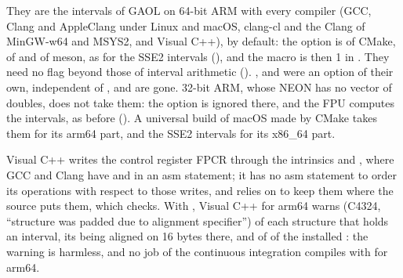 \documentclass[12pt,a4paper,twoside,openright]{book}
\begin{document}
\medskip
They are the intervals of GAOL on 64-bit ARM with every compiler (GCC, Clang
and AppleClang under Linux and macOS, clang-cl and the Clang of MinGW-w64 and
MSYS2, and Visual C++), by default: the option is  of
CMake,  of  and  of
meson, as for the SSE2 intervals (), and the macro
 is then 1 in
. They need no flag beyond those of interval
arithmetic (). ,
 and  were an option of their
own, independent of , and are gone.\newinvfive{} 32-bit
ARM, whose NEON has no vector of doubles, does not take them: the option is
ignored there, and the FPU computes the intervals, as before
(). A universal build of macOS made by CMake takes
them for its arm64 part, and the SSE2 intervals for its x86\_64 part.

\medskip
Visual C++ writes the control register FPCR through the intrinsics
 and , where GCC and Clang
have  and  in an asm statement; it has no asm statement
to order its operations with respect to those writes, and relies on
 to keep them where the source puts them, which
 checks. With , Visual C++
for arm64 warns (C4324, ``structure was padded due to alignment specifier'')
of each structure that holds an interval, its  being
aligned on 16 bytes there, and of  of the installed
: the warning is harmless, and no job of
the continuous integration compiles with  for
arm64.\newinvfive
\end{document}
